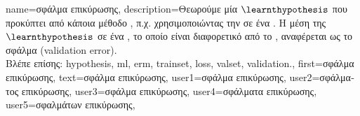{name={\foreignlanguage{greek}{σφάλμα επικύρωσης}},
	description={\foreignlanguage{greek}{Θεωρούμε μία}  $\learnthypothesis$ 
		\foreignlanguage{greek}{που προκύπτει από κάποια μέθοδο} , \foreignlanguage{greek}{π.χ. χρησιμοποιώντας την} 
		 \foreignlanguage{greek}{σε ένα} . \foreignlanguage{greek}{Η μέση}  
		\foreignlanguage{greek}{της} $\learnthypothesis$ \foreignlanguage{greek}{σε ένα} , \foreignlanguage{greek}{το οποίο είναι 
		διαφορετικό από το} , \foreignlanguage{greek}{αναφέρεται ως το σφάλμα}  (validation error).
		\\
		\foreignlanguage{greek}{Βλέπε επίσης:} \gls{hypothesis}, \gls{ml}, \gls{erm}, \gls{trainset}, \gls{loss}, \gls{valset}, \gls{validation}.},
	first={\foreignlanguage{greek}{σφάλμα επικύρωσης}},
	text={\foreignlanguage{greek}{σφάλμα επικύρωσης}},
	user1={\foreignlanguage{greek}{σφάλμα επικύρωσης}}, %
	user2={\foreignlanguage{greek}{σφάλματος επικύρωσης}}, %
	user3={\foreignlanguage{greek}{σφάλμα επικύρωσης}}, %
	user4={\foreignlanguage{greek}{σφάλματα επικύρωσης}}, %
	user5={\foreignlanguage{greek}{σφαλμάτων επικύρωσης}}, %
}

